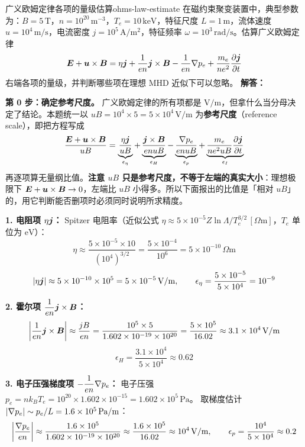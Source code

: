 \begin{example}{广义欧姆定律各项的量级估算}{ohms-law-estimate}
在磁约束聚变装置中，典型参数为：$B=5\,\mathrm{T}$，$n=10^{20}\,\mathrm{m}^{-3}$，$T_e=10\,\mathrm{keV}$，特征尺度 $L=1\,\mathrm{m}$，流体速度 $u=10^4\,\mathrm{m/s}$，电流密度 $j=10^5\,\mathrm{A/m^2}$，特征频率 $\omega=10^3\,\mathrm{rad/s}$。估算广义欧姆定律
\[
\bm{E} + \bm{u}\times\bm{B} = \eta\bm{j} + \frac{1}{en}\bm{j}\times\bm{B} - \frac{1}{en}\nabla p_e + \frac{m_e}{ne^2}\frac{\partial\bm{j}}{\partial t}
\]
右端各项的量级，并判断哪些项在理想 MHD 近似下可以忽略。
\tcblower
\textbf{解答：}

\textbf{第 0 步：确定参考尺度。} 广义欧姆定律的所有项都是 $\mathrm{V/m}$，但拿什么当分母决定了结论。本题统一以 $uB=10^4\times5=5\times10^4\,\mathrm{V/m}$ 为\textbf{参考尺度}（reference scale），即把方程写成
\[
\frac{\bm{E} + \bm{u}\times\bm{B}}{uB}
= \underbrace{\frac{\eta\bm{j}}{uB}}_{\epsilon_\eta}
+ \underbrace{\frac{\bm{j}\times\bm{B}}{enuB}}_{\epsilon_H}
- \underbrace{\frac{\nabla p_e}{enuB}}_{\epsilon_p}
+ \underbrace{\frac{m_e}{ne^2uB}\frac{\partial\bm{j}}{\partial t}}_{\epsilon_I}
\]
再逐项算无量纲比值。\textbf{注意 $uB$ 只是参考尺度，不等于左端的真实大小}：理想极限下 $\bm{E}+\bm{u}\times\bm{B}\to0$，左端比 $uB$ 小得多。所以下面报出的比值是「相对 $uB$」的，用它判断能否删项时必须同时说明所求精度。

\textbf{1. 电阻项 $\eta\bm{j}$：}
Spitzer 电阻率（近似公式 $\eta \approx 5\times 10^{-5} Z\ln\Lambda / T_e^{3/2}\,[\Omega\mathrm{m}]$，$T_e$ 单位为 $\mathrm{eV}$）：
\[
\eta \approx \frac{5\times 10^{-5}\times 10}{(10^4)^{3/2}} = \frac{5\times 10^{-4}}{10^6} = 5\times 10^{-10}\,\Omega\mathrm{m}
\]
\[
|\eta\bm{j}| \approx 5\times 10^{-10}\times 10^5 = 5\times 10^{-5}\,\mathrm{V/m},
\qquad \epsilon_\eta = \frac{5\times10^{-5}}{5\times10^4} = 10^{-9}
\]

\textbf{2. 霍尔项 $\dfrac{1}{en}\bm{j}\times\bm{B}$：}
\[
\left|\frac{1}{en}\bm{j}\times\bm{B}\right| \approx \frac{jB}{en} = \frac{10^5\times 5}{1.602\times 10^{-19}\times 10^{20}} = \frac{5\times 10^5}{16.02} \approx 3.1\times 10^4\,\mathrm{V/m}
\]
\[
\epsilon_H = \frac{3.1\times10^4}{5\times10^4} \approx 0.62
\]

\textbf{3. 电子压强梯度项 $-\dfrac{1}{en}\nabla p_e$：}
电子压强 $p_e = nk_{\!B}T_e = 10^{20}\times 1.602\times 10^{-15} = 1.602\times 10^5\,\mathrm{Pa}$。
取梯度估计 $|\nabla p_e| \sim p_e/L = 1.6\times 10^5\,\mathrm{Pa/m}$：
\[
\left|\frac{\nabla p_e}{en}\right| \approx \frac{1.6\times 10^5}{1.602\times 10^{-19}\times 10^{20}} \approx \frac{1.6\times 10^5}{16.02} \approx 10^4\,\mathrm{V/m},
\qquad \epsilon_p = \frac{10^4}{5\times10^4} \approx 0.2
\]


\end{example}
